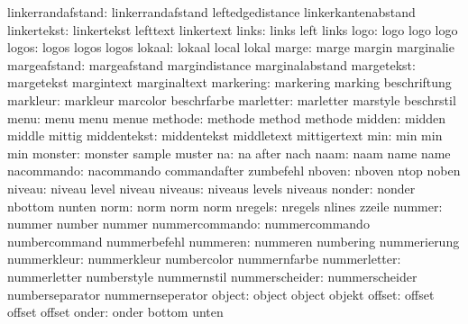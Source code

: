    linkerrandafstand:  linkerrandafstand    leftedgedistance     linkerkantenabstand
         linkertekst:  linkertekst          lefttext             linkertext
               links:  links                left                 links
                logo:  logo                 logo                 logo
               logos:  logos                logos                logos
              lokaal:  lokaal               local                lokal
               marge:  marge                margin               marginalie
        margeafstand:  margeafstand         margindistance       marginalabstand
          margetekst:  margetekst           margintext           marginaltext
           markering:  markering            marking              beschriftung
            markleur:  markleur             marcolor             beschrfarbe
           marletter:  marletter            marstyle             beschrstil
                menu:  menu                 menu                 menue
             methode:  methode              method               methode
              midden:  midden               middle               mittig
         middentekst:  middentekst          middletext           mittigertext
                 min:  min                  min                  min
             monster:  monster              sample               muster
                  na:  na                   after                nach
                naam:  naam                 name                 name
          nacommando:  nacommando           commandafter         zumbefehl
              nboven:  nboven               ntop                 noben
              niveau:  niveau               level                niveau
             niveaus:  niveaus              levels               niveaus
              nonder:  nonder               nbottom              nunten
                norm:  norm                 norm                 norm
             nregels:  nregels              nlines               zzeile
              nummer:  nummer               number               nummer
      nummercommando:  nummercommando       numbercommand        nummerbefehl
            nummeren:  nummeren             numbering            nummerierung
         nummerkleur:  nummerkleur          numbercolor          nummernfarbe
        nummerletter:  nummerletter         numberstyle          nummernstil
      nummerscheider:  nummerscheider       numberseparator      nummernseperator
              object:  object               object               objekt
              offset:  offset               offset               offset
               onder:  onder                bottom               unten
